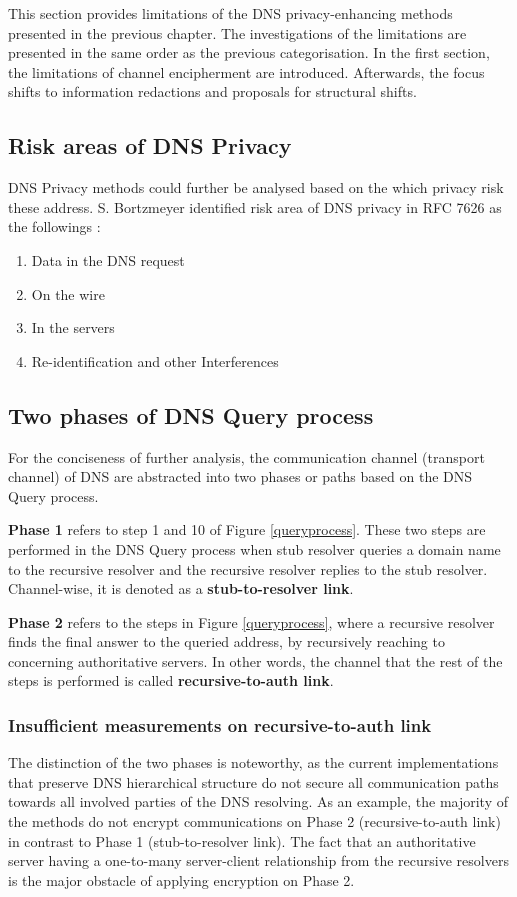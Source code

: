 This section provides limitations of the DNS privacy-enhancing methods presented in the previous chapter.
The investigations of the limitations are presented in the same order as the previous categorisation. In the first section, the limitations of channel encipherment are introduced.
Afterwards, the focus shifts to information redactions and proposals for structural shifts.

\subsection{Risk areas of DNS Privacy}
DNS Privacy methods could further be analysed based on the which privacy risk these address. S. Bortzmeyer identified risk area of DNS privacy in RFC 7626 as the followings \cite{rfc7626}: 
\begin{enumerate}
    \item Data in the DNS request
    \item On the wire
    \item In the servers
    \item Re-identification and other Interferences
\end{enumerate}

\subsection{Two phases of DNS Query process}
For the conciseness of further analysis, the communication channel (transport channel) of DNS are abstracted into two phases or paths based on the DNS Query process.

\textbf{Phase 1} refers to step 1 and 10 of Figure \ref{queryprocess}. These two steps are performed in the DNS Query process when stub resolver queries a domain name to the recursive resolver and the recursive resolver replies to the stub resolver.
Channel-wise, it is denoted as a \textbf{stub-to-resolver link}.

\textbf{Phase 2} refers to the steps in Figure \ref{queryprocess}, where a recursive resolver finds the final answer to the queried address, by recursively reaching to concerning authoritative servers. In other words, the channel that the rest of the steps is performed is called \textbf{recursive-to-auth link}.

\subsubsection{Insufficient measurements on recursive-to-auth link}\label{recursive-auth-limitations}
The distinction of the two phases is noteworthy, as the current implementations that preserve DNS hierarchical structure do not secure all communication paths towards all involved parties of the DNS resolving.
As an example, the majority of the methods do not encrypt communications on Phase 2 (recursive-to-auth link) in contrast to Phase 1 (stub-to-resolver link).
The fact that an authoritative server having a one-to-many server-client relationship from the recursive resolvers is the major obstacle of applying encryption on Phase 2.

